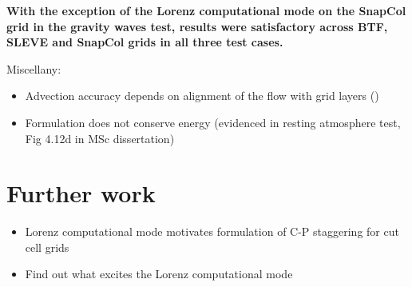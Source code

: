 \documentclass[a4paper]{article}
\begin{document}
\textbf{With the exception of the Lorenz computational mode on the SnapCol grid in the gravity waves test, results were satisfactory across BTF, SLEVE and SnapCol grids in all three test cases.}

Miscellany:
\begin{itemize}
	\item Advection accuracy depends on alignment of the flow with grid layers ()
	\item Formulation does not conserve energy (evidenced in resting atmosphere test, Fig 4.12d in MSc dissertation)
\end{itemize}

\section{Further work}
\begin{itemize}
	\item Lorenz computational mode motivates formulation of C-P staggering for cut cell grids
	\item Find out what excites the Lorenz computational mode
\end{itemize}
\end{document}
